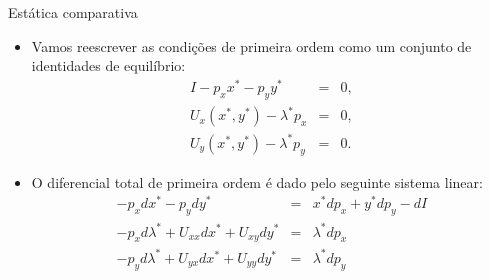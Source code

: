 \documentclass[10pt]{beamer}
\begin{document}
\begin{frame}{Estática comparativa}
\begin{itemize}
    \item Vamos reescrever as condições de primeira ordem como um conjunto de identidades de equilíbrio:
    \begin{eqnarray*}
    I - p_xx^* - p_yy^* &=& 0, \\
    U_x(x^*,y^*) - \lambda^*p_x &=& 0, \nonumber \\
    U_y(x^*,y^*) - \lambda^*p_y &=& 0. \nonumber
    \end{eqnarray*}
    \bigskip
    \item O diferencial total de primeira ordem é dado pelo seguinte sistema linear:
    \begin{eqnarray*}
    -p_xdx^* - p_ydy^* &=& x^*dp_x + y^*dp_y - dI \\
    -p_xd\lambda^* + U_{xx}dx^* + U_{xy}dy^* &=& \lambda^*dp_x \\
    -p_yd\lambda^* + U_{yx}dx^* + U_{yy}dy^* &=& \lambda^*dp_y
    \end{eqnarray*}
\end{itemize}
\end{frame}
\end{document}
